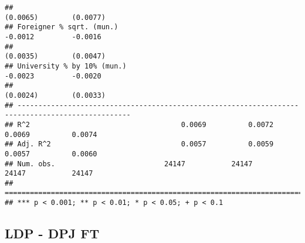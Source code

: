 \documentclass[
]{article}
\begin{document}
\begin{verbatim}
##                                                                       (0.0065)        (0.0077)   
## Foreigner % sqrt. (mun.)                                              -0.0012         -0.0016    
##                                                                       (0.0035)        (0.0047)   
## University % by 10% (mun.)                                            -0.0023         -0.0020    
##                                                                       (0.0024)        (0.0033)   
## -------------------------------------------------------------------------------------------------
## R^2                                    0.0069          0.0072          0.0069          0.0074    
## Adj. R^2                               0.0057          0.0059          0.0057          0.0060    
## Num. obs.                          24147           24147           24147           24147         
## =================================================================================================
## *** p < 0.001; ** p < 0.01; * p < 0.05; + p < 0.1
\end{verbatim}

\hypertarget{ldp---dpj-ft}{%
\subsection{LDP - DPJ FT}\label{ldp---dpj-ft}}
\end{document}
